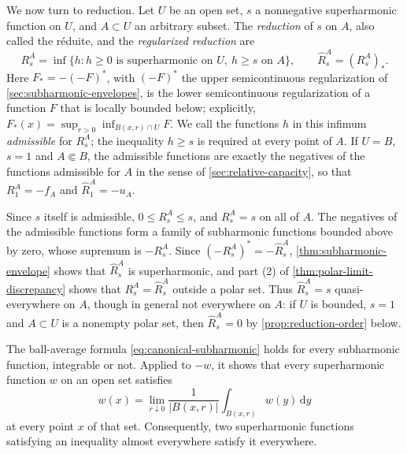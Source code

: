 We now turn to reduction. Let $U$ be an open set, $s$ a nonnegative superharmonic function on $U$, and $A\subset U$ an arbitrary subset. The \emph{reduction} of $s$ on $A$, also called the r\'eduite, and the \emph{regularized reduction} are
\[
 R_s^A=\inf\{h:h\geq0\text{ is superharmonic on }U,\ h\geq s\text{ on }A\},
 \qquad \widehat R_s^A=(R_s^A)_*.
\]
Here $F_*=-(-F)^*$, with $(-F)^*$ the upper semicontinuous regularization of \cref{sec:subharmonic-envelopes}, is the lower semicontinuous regularization of a function $F$ that is locally bounded below; explicitly, $F_*(x)=\sup_{r>0}\inf_{B(x,r)\cap U}F$. We call the functions $h$ in this infimum \emph{admissible} for $R_s^A$; the inequality $h\geq s$ is required at every point of $A$. If $U=B$, $s=1$ and $A\Subset B$, the admissible functions are exactly the negatives of the functions admissible for $A$ in the sense of \cref{sec:relative-capacity}, so that $R_1^A=-f_A$ and $\widehat R_1^A=-u_A$.

Since $s$ itself is admissible, $0\leq R_s^A\leq s$, and $R_s^A=s$ on all of $A$. The negatives of the admissible functions form a family of subharmonic functions bounded above by zero, whose supremum is $-R_s^A$. Since $(-R_s^A)^*=-\widehat R_s^A$, \cref{thm:subharmonic-envelope} shows that $\widehat R_s^A$ is superharmonic, and part (2) of \cref{thm:polar-limit-discrepancy} shows that $R_s^A=\widehat R_s^A$ outside a polar set. Thus $\widehat R_s^A=s$ quasi-everywhere on $A$, though in general not everywhere on $A$: if $U$ is bounded, $s=1$ and $A\subset U$ is a nonempty polar set, then $\widehat R_s^A=0$ by \cref{prop:reduction-order} below.

The ball-average formula \eqref{eq:canonical-subharmonic} holds for every subharmonic function, integrable or not. Applied to $-w$, it shows that every superharmonic function $w$ on an open set satisfies
\[
 w(x)=\lim_{r\downarrow0}\frac{1}{|B(x,r)|}\int_{B(x,r)}w(y)\,\mathrm d y
\]
at every point $x$ of that set. Consequently, two superharmonic functions satisfying an inequality almost everywhere satisfy it everywhere.

